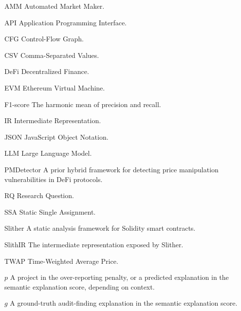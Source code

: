 
\begin{denotation}[4cm]

\item[AMM]{
  Automated Market Maker.
}

\item[API]{
  Application Programming Interface.
}

\item[CFG]{
  Control-Flow Graph.
}

\item[CSV]{
  Comma-Separated Values.
}

\item[DeFi]{
  Decentralized Finance.
}

\item[EVM]{
  Ethereum Virtual Machine.
}

\item[F1-score]{
  The harmonic mean of precision and recall.
}

\item[IR]{
  Intermediate Representation.
}

\item[JSON]{
  JavaScript Object Notation.
}

\item[LLM]{
  Large Language Model.
}

\item[PMDetector]{
  A prior hybrid framework for detecting price manipulation vulnerabilities in DeFi protocols.
}

\item[RQ]{
  Research Question.
}

\item[SSA]{
  Static Single Assignment.
}

\item[Slither]{
  A static analysis framework for Solidity smart contracts.
}

\item[SlithIR]{
  The intermediate representation exposed by Slither.
}

\item[TWAP]{
  Time-Weighted Average Price.
}

\item[$p$]{
  A project in the over-reporting penalty, or a predicted explanation in the semantic explanation score, depending on context.
}

\item[$g$]{
  A ground-truth audit-finding explanation in the semantic explanation score.
}


\end{denotation}
